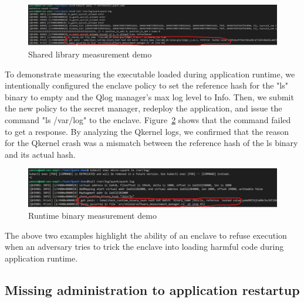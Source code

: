 \begin{figure}[!htb]
    \centering
    \includegraphics[width=1\textwidth]{images/cquark_runtime_runtime_lib_measurement_demo.png}
    \caption[Shared library measurement demo]{Shared library measurement demo}
    \label{fig:cquark_runtime_runtime_lib_measurement_demo}
\end{figure}




To demonstrate measuring the executable loaded during application runtime, we intentionally configured the enclave policy to set the reference hash for the "ls" binary to empty and the Qlog manager's max log level to Info. Then, we submit the new policy to the secret manager,  
redeploy the application, and issue the command "ls /var/log" to the enclave. Figure~\ref{fig:cquark_runtime_runtime_binary_measurement_demo}  shows that the command failed to get a response. By analyzing the Qkernel logs, we confirmed that the reason for the Qkernel crash was a mismatch between the reference hash of the ls binary and its actual hash.


\begin{figure}[!htb]
    \centering
    \includegraphics[width=1\textwidth]{images/cquark_runtime_runtime_binary_measurement_demo.png}
    \caption[Runtime binary measurement demo]{Runtime binary measurement demo}
    \label{fig:cquark_runtime_runtime_binary_measurement_demo}
\end{figure}



The above two examples highlight the ability of an enclave to refuse execution when an adversary tries to trick the enclave into loading harmful code during application runtime.

\subsection{Missing administration to application restartup}


